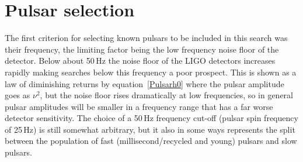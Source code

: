 
\section{Pulsar selection}
The first criterion for selecting known pulsars to be included in this search was their frequency,
the limiting factor being the low frequency noise floor of the detector. Below about 50\,Hz the
noise floor of the LIGO detectors increases rapidly making searches below this frequency a poor
prospect. This is shown as a law of diminishing returns by equation~\ref{Pulsarh0} where the pulsar
amplitude goes as $\nu^2$, but the noise floor rises dramatically at low frequencies, so in
general pulsar \gw amplitudes will be smaller in a frequency range that has a far worse detector
sensitivity. The choice of a 50\,Hz \gw frequency cut-off (pulsar spin frequency of 25\,Hz) is still
somewhat arbitrary, but it also in some ways represents the split between the population of fast
(millisecond/recycled and young) pulsars and slow pulsars.


